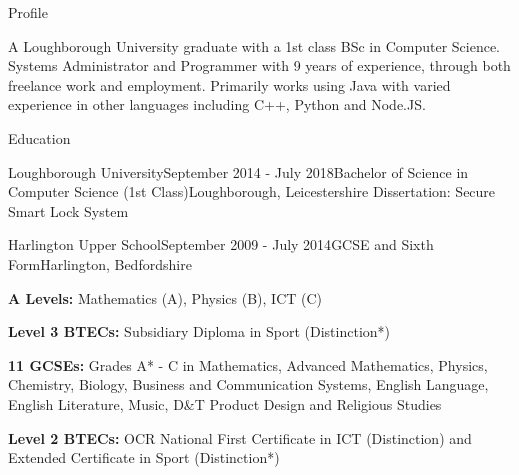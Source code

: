 \documentclass{resume} %
\begin{document}

\begin {rSection}{Profile}

A Loughborough University graduate with a 1st class BSc in Computer Science. Systems Administrator and Programmer with 9 years of experience, through both freelance work and employment. Primarily works using Java with varied experience in other languages including C++, Python and Node.JS.

\end{rSection}


\begin{rSection}{Education}

\begin{rSubsection}{Loughborough University}{September 2014 - July 2018}{Bachelor of Science in Computer Science (1st Class)}{Loughborough, Leicestershire}
Dissertation: Secure Smart Lock System
\end{rSubsection}

\begin{rSubsection}{Harlington Upper School}{September 2009 - July 2014}{GCSE and Sixth Form}{Harlington, Bedfordshire}
\item \textbf{A Levels: } Mathematics (A), Physics (B), ICT (C)
\item \textbf{Level 3 BTECs: } Subsidiary Diploma in Sport (Distinction*) \smallskip \smallskip
\item \textbf{11 GCSEs: } Grades A* - C in Mathematics, Advanced Mathematics, Physics, Chemistry, Biology, Business and Communication Systems, English Language, English Literature, Music, D\&T Product Design and Religious Studies
\item \textbf{Level 2 BTECs: } OCR National First Certificate in ICT (Distinction) and Extended Certificate in Sport (Distinction*)
\end{rSubsection}
\end{rSection}

\end{document}
